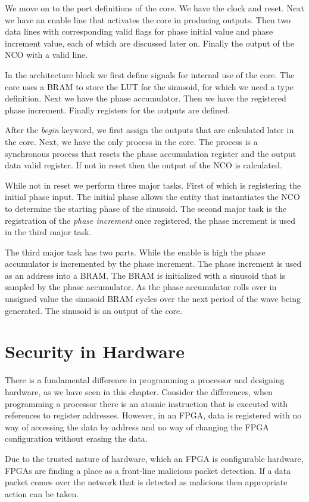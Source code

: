 We move on to the port definitions of the core. We have the clock and reset. Next we have an enable line that activates the core in producing outputs. Then two data lines with corresponding valid flags for phase initial value and phase increment value, each of which are discussed later on. Finally the output of the \ac{NCO} with a valid line. 

In the architecture block we first define signals for internal use of the core. The core uses a \ac{BRAM} to store the \ac{LUT} for the sinusoid, for which we need a type definition. Next we have the phase accumulator. Then we have the registered phase increment. Finally registers for the outputs are defined.

After the \emph{begin} keyword, we first assign the outputs that are calculated later in the core. Next, we have the only process in the core. The process is a synchronous process that resets the phase accumulation register and the output data valid register. If not in reset then the output of the \ac{NCO} is calculated. 

While not in reset we perform three major tasks. First of which is registering the initial phase input. The initial phase allows the entity that instantiates the \ac{NCO} to determine the starting phase of the sinusoid. The second major task is the registration of the \emph{phase increment} once registered, the phase increment is used in the third major task.

The third major task has two parts. While the enable is high the phase accumulator is incremented by the phase increment. The phase increment is used as an address into a \ac{BRAM}. The \ac{BRAM} is initialized with a sinusoid that is sampled by the phase accumulator. As the phase accumulator rolls over in unsigned value the sinusoid \ac{BRAM} cycles over the next period of the wave being generated. The sinusoid is an output of the core. 

\section{Security in Hardware}

There is a fundamental difference in programming a processor and designing hardware, as we have seen in this chapter. Consider the differences, when programming a processor there is an atomic instruction that is executed with references to register addresses. However, in an \ac{FPGA}, data is registered with no way of accessing the data by address and no way of changing the \ac{FPGA} configuration without erasing the data. 

Due to the trusted nature of hardware, which an \ac{FPGA} is configurable hardware, \ac{FPGA}s are finding a place as a front-line malicious packet detection. If a data packet comes over the network that is detected as malicious then appropriate action can be taken. 
